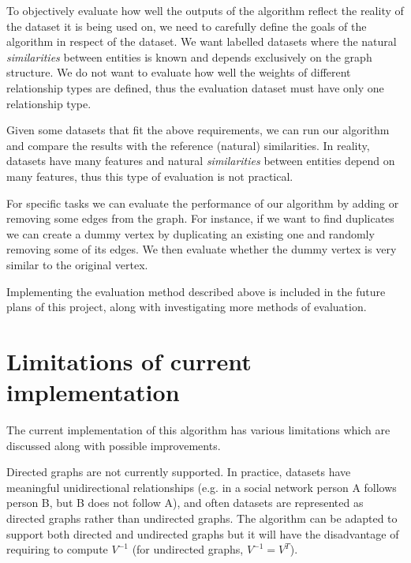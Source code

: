 \documentclass[12pt]{report}
\begin{document}
To objectively evaluate how well the outputs of the algorithm reflect the reality
of the dataset it is being used on, we need to carefully define the goals of the
algorithm in respect of the dataset. We want labelled datasets where the natural
\textit{similarities} between entities is known and depends exclusively on the
graph structure. We do not want to evaluate how well the weights of different
relationship types are defined, thus the evaluation dataset must have only one
relationship type.


Given some datasets that fit the above requirements, we can run our algorithm and
compare the results with the reference (natural) similarities. In reality, datasets
have many features and natural \textit{similarities} between entities depend on many
features, thus this type of evaluation is not practical.


For specific tasks we can evaluate the performance of our algorithm by adding or
removing some edges from the graph. For instance, if we want to find duplicates
we can create a dummy vertex by duplicating an existing one and randomly removing
some of its edges. We then evaluate whether the dummy vertex is very similar to
the original vertex.


Implementing the evaluation method described above is included in the future plans
of this project, along with investigating more methods of evaluation.


%
%
\section{Limitations of current implementation}
%
The current implementation of this algorithm has various limitations which are
discussed along with possible improvements.


Directed graphs are not currently supported. In practice, datasets have meaningful
unidirectional relationships (e.g. in a social network person A follows person B,
but B does not follow A), and often datasets are represented as directed graphs
rather than undirected graphs. The algorithm can be adapted to support both directed
and undirected graphs but it will have the disadvantage of requiring to compute
$V^{-1}$ (for undirected graphs, $V^{-1} = V^T$).
\end{document}
